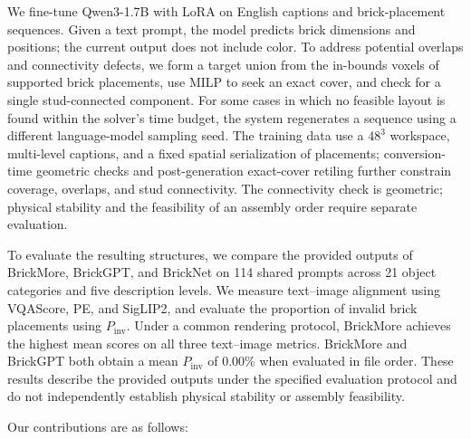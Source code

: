 \documentclass[10pt,twocolumn,letterpaper]{article}
\begin{document}
We fine-tune Qwen3-1.7B with LoRA on English captions and brick-placement sequences. Given a text prompt, the model predicts brick dimensions and positions; the current output does not include color. To address potential overlaps and connectivity defects, we form a target union from the in-bounds voxels of supported brick placements, use MILP to seek an exact cover, and check for a single stud-connected component. For some cases in which no feasible layout is found within the solver's time budget, the system regenerates a sequence using a different language-model sampling seed. The training data use a $48^3$ workspace, multi-level captions, and a fixed spatial serialization of placements; conversion-time geometric checks and post-generation exact-cover retiling further constrain coverage, overlaps, and stud connectivity. The connectivity check is geometric; physical stability and the feasibility of an assembly order require separate evaluation.

To evaluate the resulting structures, we compare the provided outputs of BrickMore, BrickGPT, and BrickNet on 114 shared prompts across 21 object categories and five description levels. We measure text--image alignment using VQAScore, PE, and SigLIP2, and evaluate the proportion of invalid brick placements using $P_{\mathrm{inv}}$. Under a common rendering protocol, BrickMore achieves the highest mean scores on all three text--image metrics. BrickMore and BrickGPT both obtain a mean $P_{\mathrm{inv}}$ of 0.00\% when evaluated in file order. These results describe the provided outputs under the specified evaluation protocol and do not independently establish physical stability or assembly feasibility.

Our contributions are as follows:
\end{document}
